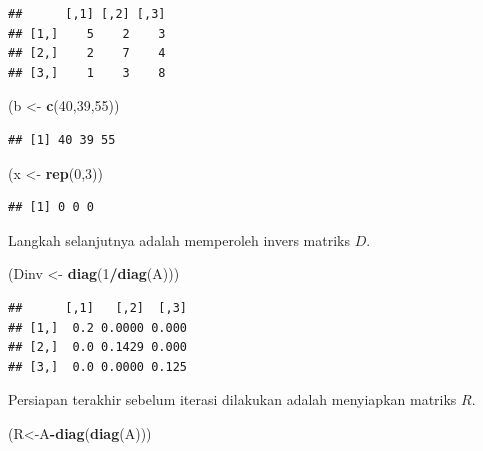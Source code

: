 \documentclass[]{book}
\newenvironment{Shaded}{\begin{snugshade}}{\end{snugshade}}
\newcommand{\DecValTok}[1]{\textcolor[rgb]{0.00,0.00,0.81}{#1}}
\newcommand{\KeywordTok}[1]{\textcolor[rgb]{0.13,0.29,0.53}{\textbf{#1}}}
\newcommand{\NormalTok}[1]{#1}
\newcommand{\OperatorTok}[1]{\textcolor[rgb]{0.81,0.36,0.00}{\textbf{#1}}}
\newcommand{\StringTok}[1]{\textcolor[rgb]{0.31,0.60,0.02}{#1}}
\theoremstyle{definition}
\theoremstyle{definition}
\theoremstyle{definition}
\theoremstyle{remark}
\begin{document}
\begin{verbatim}
##      [,1] [,2] [,3]
## [1,]    5    2    3
## [2,]    2    7    4
## [3,]    1    3    8
\end{verbatim}

\begin{Shaded}
\begin{Highlighting}[]
\NormalTok{(b <-}\StringTok{ }\KeywordTok{c}\NormalTok{(}\DecValTok{40}\NormalTok{,}\DecValTok{39}\NormalTok{,}\DecValTok{55}\NormalTok{))}
\end{Highlighting}
\end{Shaded}

\begin{verbatim}
## [1] 40 39 55
\end{verbatim}

\begin{Shaded}
\begin{Highlighting}[]
\NormalTok{(x <-}\StringTok{ }\KeywordTok{rep}\NormalTok{(}\DecValTok{0}\NormalTok{,}\DecValTok{3}\NormalTok{))}
\end{Highlighting}
\end{Shaded}

\begin{verbatim}
## [1] 0 0 0
\end{verbatim}

Langkah selanjutnya adalah memperoleh invers matriks \(D\).

\begin{Shaded}
\begin{Highlighting}[]
\NormalTok{(Dinv <-}\StringTok{ }\KeywordTok{diag}\NormalTok{(}\DecValTok{1}\OperatorTok{/}\KeywordTok{diag}\NormalTok{(A)))}
\end{Highlighting}
\end{Shaded}

\begin{verbatim}
##      [,1]   [,2]  [,3]
## [1,]  0.2 0.0000 0.000
## [2,]  0.0 0.1429 0.000
## [3,]  0.0 0.0000 0.125
\end{verbatim}

Persiapan terakhir sebelum iterasi dilakukan adalah menyiapkan matriks \(R\).

\begin{Shaded}
\begin{Highlighting}[]
\NormalTok{(R<-A}\OperatorTok{-}\KeywordTok{diag}\NormalTok{(}\KeywordTok{diag}\NormalTok{(A)))}
\end{Highlighting}
\end{Shaded}
\end{document}

